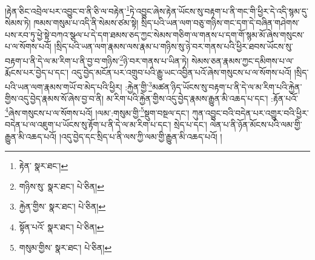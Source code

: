 །རྟེན་ཅིང་འབྲེལ་པར་འབྱུང་བ་ནི་ཅི་ལ་བརྟེན་\footnote{རྟེན་  སྣར་ཐང་། }ཏེ་འབྱུང་ཞེས་རྟེན་ཡོངས་སུ་བརྟག་པ་ནི་གང་གི་ཕྱིར་དེ་འདི་སྙམ་དུ་སེམས་ཏེ། ཁམས་གསུམ་པ་འདི་ནི་སེམས་ཙམ་སྟེ། སྲིད་པའི་ཡན་ལག་བཅུ་གཉིས་གང་དག་དེ་བཞིན་གཤེགས་པས་རབ་ཏུ་ཕྱེ་སྟེ་བཀའ་སྩལ་པ་དེ་དག་ཐམས་ཅད་ཀྱང་སེམས་གཅིག་ལ་གནས་པ་དག་གོ་སྙམ་མོ་ཞེས་གསུངས་པ་ལ་སོགས་པའོ། །སྲིད་པའི་ཡན་ལག་རྣམས་ལས་རྣམ་པ་གཉིས་སུ་ཉེ་བར་གནས་པའི་ཕྱིར་ཐབས་ཡོངས་སུ་བརྟག་པ་ནི་དེ་ལ་མ་རིག་པ་ནི་བྱ་བ་གཉིས་\footnote{གཉིས་སུ་  སྣར་ཐང་།  པེ་ཅིན། }ཉེ་བར་གནས་པ་ཡིན་ཏེ། སེམས་ཅན་རྣམས་ཀྱང་དམིགས་པ་ལ་རྨོངས་པར་བྱེད་པ་དང་། འདུ་བྱེད་མངོན་པར་འགྲུབ་པའི་རྒྱུ་ཡང་འབྱིན་པའོ་ཞེས་གསུངས་པ་ལ་སོགས་པའོ། །སྲིད་པའི་ཡན་ལག་རྣམས་གཡོ་བ་མེད་པའི་ཕྱིར། :རྐྱེན་གྱི་\footnote{རྐྱེན་གྱིས་  སྣར་ཐང་།  པེ་ཅིན། }མཚན་ཉིད་ཡོངས་སུ་བརྟག་པ་ནི་དེ་ལ་མ་རིག་པའི་རྐྱེན་གྱིས་འདུ་བྱེད་རྣམས་སོ་ཞེས་བྱ་བ་ནི། མ་རིག་པའི་རྐྱེན་གྱིས་འདུ་བྱེད་རྣམས་རྒྱུན་མི་འཆད་པ་དང་། :རྟོན་པའོ་\footnote{སྟོན་པའོ་  སྣར་ཐང་།  པེ་ཅིན། }ཞེས་གསུངས་པ་ལ་སོགས་པའོ། །ལམ་:གསུམ་གྱི་\footnote{གསུམ་གྱིས་  སྣར་ཐང་།  པེ་ཅིན། }སྡུག་བསྔལ་དང་། ཀུན་འབྱུང་བའི་བདེན་པར་འགྱུར་བའི་ཕྱིར་བདེན་པ་ལ་འཇུག་པ་ཡོངས་སུ་རྟོག་པ་ནི་དེ་ལ་མ་རིག་པ་དང་། སྲེད་པ་དང་། ལེན་པ་ནི་ཉོན་མོངས་པའི་ལམ་གྱི་རྒྱུན་མི་འཆད་པའོ། །འདུ་བྱེད་དང་སྲིད་པ་ནི་ལས་ཀྱི་ལམ་གྱི་རྒྱུན་མི་འཆད་པའོ། །
